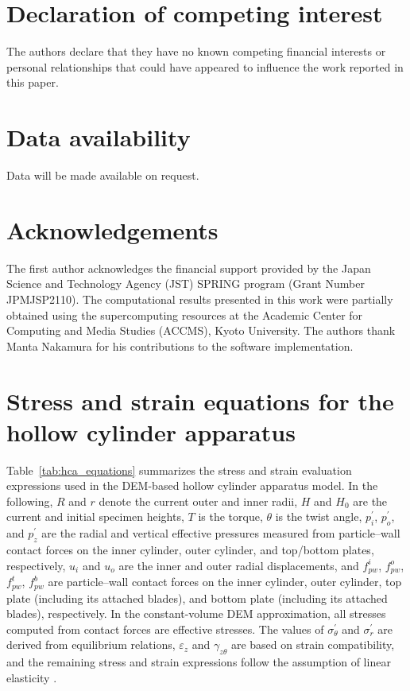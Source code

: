 \documentclass[a4paper,fleqn]{cas-sc}
\begin{document}
\section*{Declaration of competing interest}
The authors declare that they have no known competing financial interests or
personal relationships that could have appeared to influence the work reported
in this paper.

\section*{Data availability}
Data will be made available on request.

\section*{Acknowledgements}
The first author acknowledges the financial support provided by the Japan Science and Technology Agency (JST) SPRING program (Grant Number JPMJSP2110). The computational results presented in this work were partially obtained using the supercomputing resources at the Academic Center for Computing and Media Studies (ACCMS), Kyoto University. The authors thank Manta Nakamura for his contributions to the software implementation.


\printcredits

\appendix
\section{Stress and strain equations for the hollow cylinder apparatus}
\label{sec:appendix_hca}

Table~\ref{tab:hca_equations} summarizes the stress and strain evaluation expressions used in the DEM-based hollow cylinder apparatus model. In the following, $R$ and $r$ denote the current outer and inner radii, $H$ and $H_0$ are the current and initial specimen heights, $T$ is the torque, $\theta$ is the twist angle, $p_i^{\prime}$, $p_o^{\prime}$, and $p_z^{\prime}$ are the radial and vertical effective pressures measured from particle--wall contact forces on the inner cylinder, outer cylinder, and top/bottom plates, respectively, $u_i$ and $u_o$ are the inner and outer radial displacements, and $f_{pw}^{i}$, $f_{pw}^{o}$, $f_{pw}^{t}$, $f_{pw}^{b}$ are particle--wall contact forces on the inner cylinder, outer cylinder, top plate (including its attached blades), and bottom plate (including its attached blades), respectively. In the constant-volume DEM approximation, all stresses computed from contact forces are effective stresses. The values of $\sigma_\theta^{\prime}$ and $\sigma_r^{\prime}$ are derived from equilibrium relations, $\varepsilon_z$ and $\gamma_{z\theta}$ are based on strain compatibility, and the remaining stress and strain expressions follow the assumption of linear elasticity \citep{Hight1983}.
\end{document}
